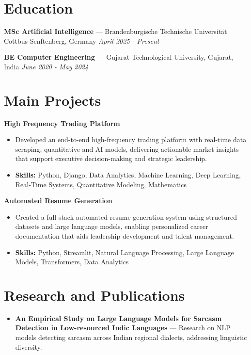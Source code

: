 \documentclass[a4paper,10pt]{article}
\begin{document}
\section*{Education}
\textbf{MSc Artificial Intelligence} — Brandenburgische Technische Universität Cottbus-Senftenberg, Germany \hfill \textit{April 2025 - Present}\par
\vspace{1.5pt}
\textbf{BE Computer Engineering} — Gujarat Technological University, Gujarat, India \hfill \textit{June 2020 - May 2024}\par

\section*{Main Projects}
\textbf{High Frequency Trading Platform}\par
\vspace{1pt}
\begin{itemize}
  \item Developed an end-to-end high-frequency trading platform with real-time data scraping, quantitative and AI models, delivering actionable market insights that support executive decision-making and strategic leadership.
  \item \textbf{Skills:} Python, Django, Data Analytics, Machine Learning, Deep Learning, Real-Time Systems, Quantitative Modeling, Mathematics
\end{itemize}
\vspace{3pt}
\textbf{Automated Resume Generation}\par
\vspace{1pt}
\begin{itemize}
  \item Created a full-stack automated resume generation system using structured datasets and large language models, enabling personalized career documentation that aids leadership development and talent management.
  \item \textbf{Skills:} Python, Streamlit, Natural Language Processing, Large Language Models, Transformers, Data Analytics
\end{itemize}

\section*{Research and Publications}
\begin{itemize}
\item \textbf{An Empirical Study on Large Language Models for Sarcasm Detection in Low-resourced Indic Languages} — Research on NLP models detecting sarcasm across Indian regional dialects, addressing linguistic diversity.
\end{itemize}
\end{document}
